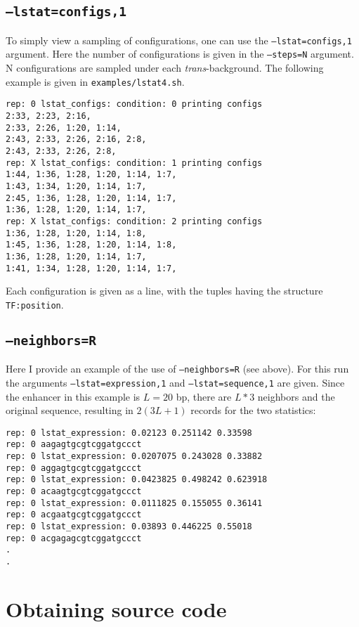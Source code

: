 \documentclass[11pt]{article}
\begin{document}
\subsection{\texttt{--lstat=configs,1}}

To simply view a sampling of configurations, one can use the \texttt{--lstat=configs,1} argument. Here the number of configurations is given in the \texttt{--steps=N} argument. N configurations are sampled under each \emph{trans}-background. The following example is given in \texttt{examples/lstat4.sh}.

\begin{verbatim}
rep: 0 lstat_configs: condition: 0 printing configs
2:33, 2:23, 2:16,
2:33, 2:26, 1:20, 1:14,
2:43, 2:33, 2:26, 2:16, 2:8,
2:43, 2:33, 2:26, 2:8,
rep: X lstat_configs: condition: 1 printing configs
1:44, 1:36, 1:28, 1:20, 1:14, 1:7,
1:43, 1:34, 1:20, 1:14, 1:7,
2:45, 1:36, 1:28, 1:20, 1:14, 1:7,
1:36, 1:28, 1:20, 1:14, 1:7,
rep: X lstat_configs: condition: 2 printing configs
1:36, 1:28, 1:20, 1:14, 1:8,
1:45, 1:36, 1:28, 1:20, 1:14, 1:8,
1:36, 1:28, 1:20, 1:14, 1:7,
1:41, 1:34, 1:28, 1:20, 1:14, 1:7,
\end{verbatim}

\noindent Each configuration is given as a line, with the tuples having the structure \texttt{TF:position}.

\subsection{\texttt{--neighbors=R}}

Here I provide an example of the use of \texttt{--neighbors=R} (see above). For this run the arguments \texttt{--lstat=expression,1} and \texttt{--lstat=sequence,1} are given. Since the enhancer in this example is $L=20$ bp, there are $L*3$ neighbors and the original sequence, resulting in $2(3L+1)$ records for the two statistics:

\begin{verbatim}
rep: 0 lstat_expression: 0.02123 0.251142 0.33598
rep: 0 aagagtgcgtcggatgccct
rep: 0 lstat_expression: 0.0207075 0.243028 0.33882
rep: 0 aggagtgcgtcggatgccct
rep: 0 lstat_expression: 0.0423825 0.498242 0.623918
rep: 0 acaagtgcgtcggatgccct
rep: 0 lstat_expression: 0.0111825 0.155055 0.36141
rep: 0 acgaatgcgtcggatgccct
rep: 0 lstat_expression: 0.03893 0.446225 0.55018
rep: 0 acgagagcgtcggatgccct
.
.
\end{verbatim}

\section{Obtaining source code}
\end{document}
